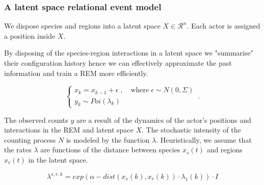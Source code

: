 \documentclass[
	11pt, %
]{beamer}
\begin{document}
\begin{frame}
	\frametitle{A latent space relational event model}
	We dispose species and regions into a latent space $X \in \mathcal{R}^n$. Each actor is assigned a position inside $X$.
	
	\bigskip
	
	By disposing of the species-region interactions in a latent space we "summarise" their configuration history hence we can effectively approximate the past information and train a REM more efficiently.
	
\bigskip
\begin{equation*}
    \begin{cases}
      x_k = x_{k-1} + \epsilon \; , \quad \textrm{where} \; \epsilon \sim N(0, \Sigma) \\
      y_k \sim Poi(\lambda_k) \;
    \end{cases}\,.
\end{equation*}

\end{frame}


\begin{frame}
The observed counts $y$ are a result of the dynamics of the actor's positions and interactions in the REM and latent space $X$. The stochastic intensity of the counting process $N$ is modeled by the function $\lambda$. Heuristically, we assume that the rates $\lambda$ are functions of the distance between species $x_s(t)$ and regions $x_r(t)$ in the latent space. 

\bigskip

\[ \lambda^{s, r, k} = exp\left(\alpha-dist(x_s(k), x_r(k)) \cdot \lambda_1(k) \right) \cdot I \]

\end{frame}
\end{document}
